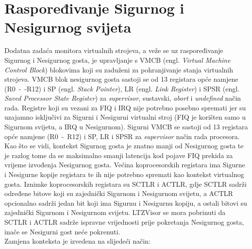 \documentclass[times, utf8, diplomski, numeric]{fer}
\begin{document}
\section{Raspoređivanje Sigurnog i Nesigurnog svijeta}
Dodatna zadaća monitora virtualnih strojeva, a veže se uz raspoređivanje Sigurnog i Nesigurnog gosta, je upravljanje s
VMCB (engl. \textit{Virtual Machine Control Block}) blokovima koji su zaduženi za pohranjivanje stanja virtualnih strojeva.
VMCB blok nesigurnog gosta sastoji se od 13 registara opće namjene (R0~-~-R12) i SP (engl. \textit{Stack Pointer}), LR
(engl. \textit{Link Register}) i SPSR (engl. \textit{Saved Processor State Register}) za \textit{supervisor}, sustavski,
\textit{abort} i \textit{undefined} način rada. Registre koji su vezani za FIQ i IRQ nije potrebno posebno spremati jer su
uzajamno isključivi za Sigurni i Nesigurni virtualni stroj (FIQ je korišten samo u Sigurnom svijetu, a IRQ u Nesigurnom).
Sigurni VMCB se sastoji od 13 registara opće namjene (R0~-~R12) i SP, LR i SPSR za \textit{supervisor} način rada procesora.
Kao što se vidi, kontekst Sigurnog gosta je znatno manji od Nesigurnog gosta te je razlog tome da se maksimalno smanji
latencija kod pojave FIQ prekida za vrijeme izvođenja Nesigurnog gosta. Većina koprocesorskih registara ima Sigurne i Nesigurne
kopije registara te ih nije potrebno spremati kao kontekst virtualnog gosta. Iznimke koprocesorskih registara su SCTLR i
ACTLR, gdje SCTLR sadrži određene bitove koji su zajednički Sigurnom i Nesigurnom svijetu, a ACTLR opcionalno sadrži jedan
bit koji ima Sigurnu i Nesigurnu kopiju, a ostali bitovi su zajednički Sigurnom i Nesigurnom svijetu. LTZVisor se mora pobrinuti
da SCTLR i ACTLR sadrže ispravne vrijednosti prije pokretanja Nesigurnog gosta, inače se Nesigurni gost neće pokrenuti.\\
Zamjena konteksta je izvedena na slijedeći način:
\end{document}
